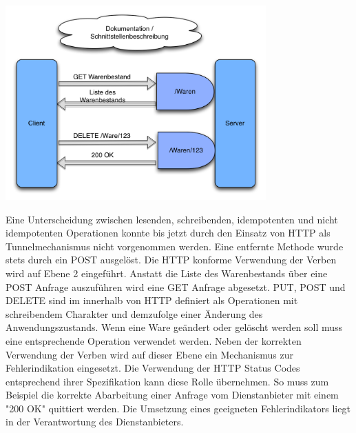 \begin{center}
		\includegraphics[width=10cm]{graphicx/MaturityLvL2.png}
		\label{hfaktoren}
	\end{center}
Eine Unterscheidung zwischen lesenden, schreibenden, idempotenten und nicht idempotenten Operationen konnte bis jetzt durch den Einsatz von HTTP als Tunnelmechanismus nicht vorgenommen werden. Eine entfernte Methode wurde stets durch ein POST ausgelöst. Die HTTP konforme Verwendung der Verben wird auf Ebene 2 eingeführt. Anstatt die Liste des Warenbestands über eine POST Anfrage auszuführen wird eine GET Anfrage abgesetzt. PUT, POST und DELETE sind im innerhalb von HTTP definiert als Operationen mit schreibendem Charakter und demzufolge einer Änderung des Anwendungszustands. Wenn eine Ware geändert oder gelöscht werden soll muss eine entsprechende Operation verwendet werden. Neben der korrekten Verwendung der Verben wird auf dieser Ebene ein Mechanismus zur Fehlerindikation eingesetzt. Die Verwendung der HTTP Status Codes entsprechend ihrer Spezifikation kann diese Rolle übernehmen. So muss zum Beispiel die korrekte Abarbeitung einer Anfrage vom Dienstanbieter mit einem "200 OK" quittiert werden. Die Umsetzung eines geeigneten Fehlerindikators liegt in der Verantwortung des Dienstanbieters.



